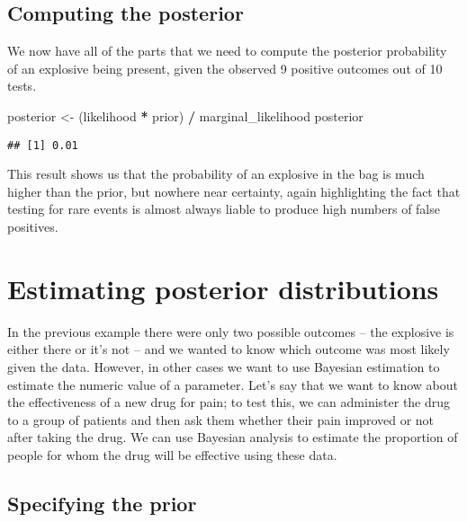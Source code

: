 \documentclass[]{book}
\newenvironment{Shaded}{\begin{snugshade}}{\end{snugshade}}
\newcommand{\StringTok}[1]{\textcolor[rgb]{0.31,0.60,0.02}{#1}}
\newcommand{\OperatorTok}[1]{\textcolor[rgb]{0.81,0.36,0.00}{\textbf{#1}}}
\newcommand{\NormalTok}[1]{#1}
\theoremstyle{definition}
\theoremstyle{definition}
\theoremstyle{definition}
\theoremstyle{remark}
\begin{document}
\subsection{Computing the posterior}\label{computing-the-posterior}

We now have all of the parts that we need to compute the posterior
probability of an explosive being present, given the observed 9 positive
outcomes out of 10 tests.

\begin{Shaded}
\begin{Highlighting}[]
\NormalTok{posterior <-}\StringTok{ }\NormalTok{(likelihood }\OperatorTok{*}\StringTok{ }\NormalTok{prior) }\OperatorTok{/}\StringTok{ }\NormalTok{marginal_likelihood}
\NormalTok{posterior}
\end{Highlighting}
\end{Shaded}

\begin{verbatim}
## [1] 0.01
\end{verbatim}

This result shows us that the probability of an explosive in the bag is
much higher than the prior, but nowhere near certainty, again
highlighting the fact that testing for rare events is almost always
liable to produce high numbers of false positives.

\section{Estimating posterior
distributions}\label{estimating-posterior-distributions}

In the previous example there were only two possible outcomes -- the
explosive is either there or it's not -- and we wanted to know which
outcome was most likely given the data. However, in other cases we want
to use Bayesian estimation to estimate the numeric value of a parameter.
Let's say that we want to know about the effectiveness of a new drug for
pain; to test this, we can administer the drug to a group of patients
and then ask them whether their pain improved or not after taking the
drug. We can use Bayesian analysis to estimate the proportion of people
for whom the drug will be effective using these data.

\subsection{Specifying the prior}\label{specifying-the-prior-1}
\end{document}
